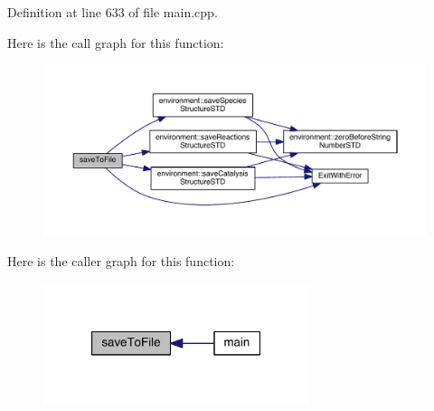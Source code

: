 Definition at line 633 of file main.\-cpp.



Here is the call graph for this function\-:
\nopagebreak
\begin{figure}[H]
\begin{center}
\leavevmode
\includegraphics[width=350pt]{a00089_acac21f7e718db9d00451e3caaaacc25f_cgraph}
\end{center}
\end{figure}




Here is the caller graph for this function\-:
\nopagebreak
\begin{figure}[H]
\begin{center}
\leavevmode
\includegraphics[width=220pt]{a00089_acac21f7e718db9d00451e3caaaacc25f_icgraph}
\end{center}
\end{figure}


